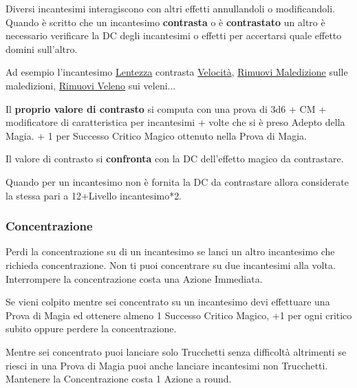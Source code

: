 \begin{multicols}{2}
Diversi incantesimi interagiscono con altri effetti annullandoli o modificandoli. Quando è scritto che un incantesimo \textbf{contrasta} o è \textbf{contrastato} un altro è necessario verificare la DC degli incantesimi o effetti per accertarsi quale effetto domini sull'altro.

Ad esempio l'incantesimo \hyperlink{Lentezza}{Lentezza} contrasta \hyperlink{Velocità}{Velocità}, \hyperlink{Rimuovi Maledizione}{Rimuovi Maledizione} sulle maledizioni, \hyperlink{Rimuovi Veleno}{Rimuovi Veleno} sui veleni...

Il \textbf{proprio valore di contrasto} si computa con una prova di 3d6 + CM + modificatore di caratteristica per incantesimi + volte che si è preso Adepto della Magia. + 1 per Successo Critico Magico ottenuto nella Prova di Magia.

Il valore di contrasto si \textbf{confronta} con la DC dell'effetto magico da contrastare.

Quando per un incantesimo non è fornita la DC da contrastare allora considerate la stessa pari a 12+Livello incantesimo*2.

\subsubsection{Concentrazione}\label{magieconcentrazione}\hypertarget{magieconcentrazione}{}

Perdi la concentrazione su di un incantesimo se lanci un altro incantesimo che richieda concentrazione. Non ti puoi concentrare su due incantesimi alla volta. Interrompere la concentrazione costa una Azione Immediata.

Se vieni colpito mentre sei concentrato su un incantesimo devi effettuare una Prova di Magia ed ottenere almeno 1 Successo Critico Magico, +1 per ogni critico subito oppure perdere la concentrazione.


Mentre sei concentrato puoi lanciare solo Trucchetti senza difficoltà altrimenti se riesci in una Prova di Magia puoi anche lanciare incantesimi non Trucchetti. Mantenere la Concentrazione costa 1 Azione a round.


\end{multicols}
